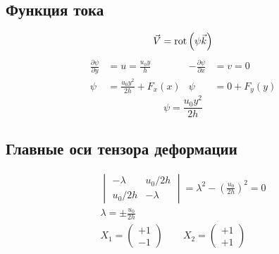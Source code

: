 \subsection{\texorpdfstring{Функция тока}{Stream function}}
\[
    \vec V = \operatorname{rot}\left(\psi \vec k\right)
\]
\begin{align*}
    \frac{\partial \psi}{\partial y} &= u = \frac{u_0 y}{h} &
    -\frac{\partial \psi}{\partial x} &= v = 0 \\
    \psi &= \frac{u_0 y^2}{2h} + F_x(x) &
    \psi &= 0 + F_y(y)
\end{align*}
\[
    \psi = \frac{u_0 y^2}{2h}
\]

\subsection{\texorpdfstring{Главные оси тензора деформации}{Eigenvectors of deformation tensor}}
\begin{gather*}
    \begin{vmatrix}
        -\lambda & u_0/2h \\
        u_0/2h & -\lambda
    \end{vmatrix}
    = \lambda^2 - \left(\frac{u_0}{2h}\right)^2
    = 0 \\
    \lambda = \pm \frac{u_0}{2h} \\
    X_1 =
    \begin{pmatrix}
        +1 \\ -1
    \end{pmatrix} \qquad
    X_2 =
    \begin{pmatrix}
        +1 \\ +1
    \end{pmatrix}
\end{gather*}
